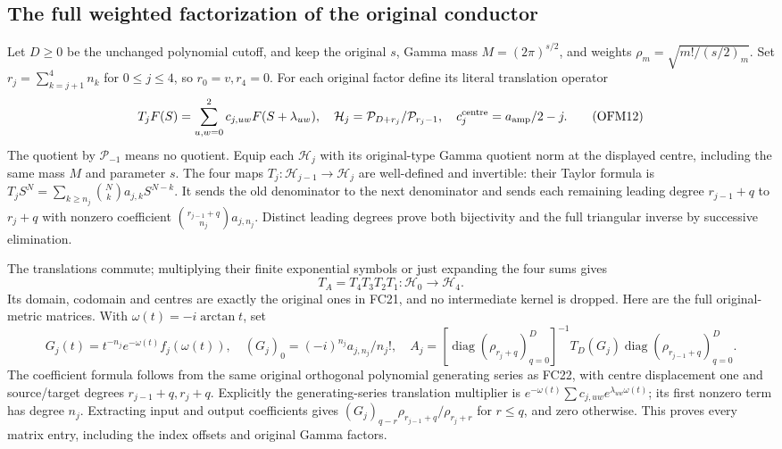 \documentclass[11pt]{article}
\begin{document}
\subsection{The full weighted factorization of the original conductor}
Let $D\ge0$ be the unchanged polynomial cutoff, and keep the original
$s$, Gamma mass $M=(2\pi)^{s/2}$, and weights
$\rho_m=\sqrt{m!/(s/2)_m}$. Set
$r_j=\sum_{k=j+1}^4n_k$ for $0\le j\le4$, so $r_0=v,r_4=0$.
For each original factor define its literal translation operator
\[
 T_jF(S)=\sum_{u,w=0}^2 c_{j,uw}F(S+\lambda_{uw}),\quad
 \mathcal H_j=\mathcal P_{D+r_j}/\mathcal P_{r_j-1},\quad
 c_j^{\rm centre}=a_{\rm amp}/2-j.
 \tag{OFM12}
\]
The quotient by $\mathcal P_{-1}$ means no quotient. Equip each
$\mathcal H_j$ with its original-type Gamma quotient norm at the
displayed centre, including the same mass $M$ and parameter $s$.
The four maps $T_j:\mathcal H_{j-1}\to\mathcal H_j$ are well-defined
and invertible: their Taylor formula is
$T_j S^N=\sum_{k\ge n_j}\binom Nk a_{j,k}S^{N-k}$.
It sends the old denominator to the next denominator and sends each
remaining leading degree $r_{j-1}+q$ to $r_j+q$ with nonzero
coefficient $\binom{r_{j-1}+q}{n_j}a_{j,n_j}$.
Distinct leading degrees prove both bijectivity and the full
triangular inverse by successive elimination.

The translations commute; multiplying their finite exponential
symbols or just expanding the four sums gives
\[
 T_A=T_4T_3T_2T_1:\mathcal H_0\longrightarrow\mathcal H_4.
 \tag{OFM13}
\]
Its domain, codomain and centres are exactly the original ones in
FC21, and no intermediate kernel is dropped.
Here are the full original-metric matrices. With
$\omega(t)=-i\arctan t$, set
\[
 G_j(t)=t^{-n_j}e^{-\omega(t)}f_j(\omega(t)),\quad
 (G_j)_0=(-i)^{n_j}a_{j,n_j}/n_j!,\quad
 A_j=\left[\operatorname{diag}(\rho_{r_j+q})_{q=0}^D\right]^{-1}
       T_D(G_j)\operatorname{diag}(\rho_{r_{j-1}+q})_{q=0}^D.
 \tag{OFM14}
\]
The coefficient formula follows from the same original orthogonal
polynomial generating series as FC22, with centre displacement one
and source/target degrees $r_{j-1}+q,r_j+q$. Explicitly the
generating-series translation multiplier is
$e^{-\omega(t)}\sum c_{j,uw}e^{\lambda_{uw}\omega(t)}$;
its first nonzero term has degree $n_j$. Extracting input and output
coefficients gives $(G_j)_{q-r}\rho_{r_{j-1}+q}/\rho_{r_j+r}$
for $r\le q$, and zero otherwise. This proves every matrix entry,
including the index offsets and original Gamma factors.
\end{document}
